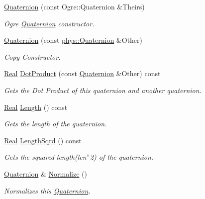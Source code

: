 \begin{DoxyCompactItemize}
\hyperlink{classphys_1_1Quaternion_a4902c05489ebae03a55433d947c53d03}{Quaternion} (const Ogre::Quaternion \&Theirs)
\begin{DoxyCompactList}\small\item\em Ogre \hyperlink{classphys_1_1Quaternion}{Quaternion} constructor. \item\end{DoxyCompactList}\item 
\hyperlink{classphys_1_1Quaternion_a46d08f43b0b638a256344b3919ba9e0d}{Quaternion} (const \hyperlink{classphys_1_1Quaternion}{phys::Quaternion} \&Other)
\begin{DoxyCompactList}\small\item\em Copy Constructor. \item\end{DoxyCompactList}\item 
\hyperlink{namespacephys_af7eb897198d265b8e868f45240230d5f}{Real} \hyperlink{classphys_1_1Quaternion_a249938e4221bf91c0853d7ff28b42392}{DotProduct} (const \hyperlink{classphys_1_1Quaternion}{Quaternion} \&Other) const 
\begin{DoxyCompactList}\small\item\em Gets the Dot Product of this quaternion and another quaternion. \item\end{DoxyCompactList}\item 
\hyperlink{namespacephys_af7eb897198d265b8e868f45240230d5f}{Real} \hyperlink{classphys_1_1Quaternion_aaa860619e9370244d1b538dd9aaf0efc}{Length} () const 
\begin{DoxyCompactList}\small\item\em Gets the length of the quaternion. \item\end{DoxyCompactList}\item 
\hyperlink{namespacephys_af7eb897198d265b8e868f45240230d5f}{Real} \hyperlink{classphys_1_1Quaternion_ac81b52051cc7dcb73fa01fb963d068a6}{LengthSqrd} () const 
\begin{DoxyCompactList}\small\item\em Gets the squared length(len$^\wedge$2) of the quaternion. \item\end{DoxyCompactList}\item 
\hyperlink{classphys_1_1Quaternion}{Quaternion} \& \hyperlink{classphys_1_1Quaternion_afafa852e782d0fe20d41bc745c8a4734}{Normalize} ()
\begin{DoxyCompactList}\small\item\em Normalizes this \hyperlink{classphys_1_1Quaternion}{Quaternion}. \item\end{DoxyCompactList}\item 

\end{DoxyCompactItemize}
